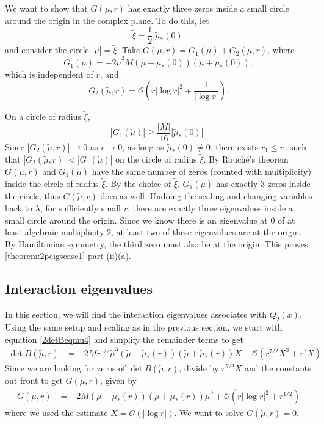 \documentclass[thesis.tex]{subfiles}
\begin{document}
We want to show that $G(\mu, r)$ has exactly three zeros inside a small circle around the origin in the complex plane. To do this, let
\[
\tilde{\xi} = \frac{1}{2}|\tilde{\mu}_*(0)|
\]
and consider the circle $|\tilde{\mu}| = \tilde{\xi}$. Take $G(\tilde{\mu}, r) = G_1(\tilde{\mu}) + G_2(\tilde{\mu}, r)$, where 
\[
G_1(\tilde{\mu}) = -2 \tilde{\mu}^3 M (\tilde{\mu} - \tilde{\mu}_*(0)) (\tilde{\mu} + \tilde{\mu}_*(0)),
\]
which is independent of $r$, and
\[
G_2(\tilde{\mu}, r) = \mathcal{O}\left( r |\log r|^2 + \frac{1}{|\log r|} \right).
\]

On a circle of radius $\tilde{\xi}$,
\[
|G_1(\tilde{\mu})| \geq \frac{|M|}{16}|\tilde{\mu}_*(0)|^5
\]
Since $|G_2(\tilde{\mu}, r)| \rightarrow 0$ as $r \rightarrow 0$, as long as $\tilde{\mu}_*(0) \neq 0$, there exists $r_1 \leq r_0$ such that $|G_2(\tilde{\mu}, r)| < |G_1(\tilde{\mu})|$ on the circle of radius $\tilde{\xi}$. By Rouch\'{e}'s theorem $G(\tilde{\mu}, r)$ and $G_1(\tilde{\mu})$ have the same number of zeros (counted with multiplicity) inside the circle of radius $\tilde{\xi}$. By the choice of $\tilde{\xi}$, $G_1(\tilde{\mu})$ has exactly 3 zeros inside the circle, thus $G(\tilde{\mu}, r)$ does as well. Undoing the scaling and changing variables back to $\lambda$, for sufficiently small $r$, there are exactly three eigenvalues inside a small circle around the origin. Since we know there is an eigenvalue at 0 of at least algebraic multiplicity 2, at least two of these eigenvalues are at the origin. By Hamiltonian symmetry, the third zero must also be at the origin. This proves \cref{theorem:2peigscase1} part (ii)(a).

\subsection{Interaction eigenvalues}

In this section, we will find the interaction eigenvalues associates with $Q_2(x)$. Using the same setup and scaling as in the previous section, we start with equation \cref{2detBeqmu4} and simplify the remainder terms to get
\begin{equation}\label{2detint2}
\begin{aligned}
\det B(\tilde{\mu}, r) &= -2 M r^{5/2} \tilde{\mu}^3 (\tilde{\mu} - \tilde{\mu}_*(r)) (\tilde{\mu} + \tilde{\mu}_*(r)) X + \mathcal{O}\left( r^{7/2} X^3 + r^3 X \right)
\end{aligned}
\end{equation}
Since we are looking for zeros of $\det B(\tilde{\mu}, r)$, divide by $r^{5/2}X$ and the constants out front to get $G(\tilde{\mu},r)$, given by
\begin{equation}\label{2detintG1}
\begin{aligned}
G(\tilde{\mu}, r) &= -2 M (\tilde{\mu} - \tilde{\mu}_*(r)) (\tilde{\mu} + \tilde{\mu}_*(r))\tilde{\mu}^3 + \mathcal{O}\left( r |\log r|^2 + r^{1/2} \right)
\end{aligned}
\end{equation}
where we used the estimate $X = \mathcal{O}(|\log r|)$. We want to solve $G(\tilde{\mu},r) = 0$.
\end{document}
